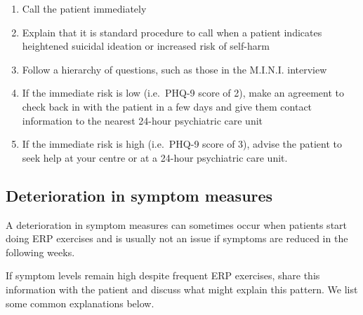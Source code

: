\documentclass[]{book}
\providecommand{\tightlist}{%
  \setlength{\itemsep}{0pt}\setlength{\parskip}{0pt}}
\theoremstyle{definition}
\theoremstyle{definition}
\theoremstyle{definition}
\theoremstyle{remark}
\begin{document}
\begin{enumerate}
\def\labelenumi{\arabic{enumi}.}
\tightlist
\item
  Call the patient immediately
\item
  Explain that it is standard procedure to call when a patient indicates
  heightened suicidal ideation or increased risk of self-harm
\item
  Follow a hierarchy of questions, such as those in the M.I.N.I.
  interview \citep{sheehan1998}
\item
  If the immediate risk is low (i.e.~PHQ-9 score of 2), make an
  agreement to check back in with the patient in a few days and give
  them contact information to the nearest 24-hour psychiatric care unit
\item
  If the immediate risk is high (i.e.~PHQ-9 score of 3), advise the
  patient to seek help at your centre or at a 24-hour psychiatric care
  unit.
\end{enumerate}

\hypertarget{deterioration-in-symptom-measures}{%
\subsection{Deterioration in symptom
measures}\label{deterioration-in-symptom-measures}}

A deterioration in symptom measures can sometimes occur when patients
start doing ERP exercises and is usually not an issue if symptoms are
reduced in the following weeks.

If symptom levels remain high despite frequent ERP exercises, share this
information with the patient and discuss what might explain this
pattern. We list some common explanations below.
\end{document}

